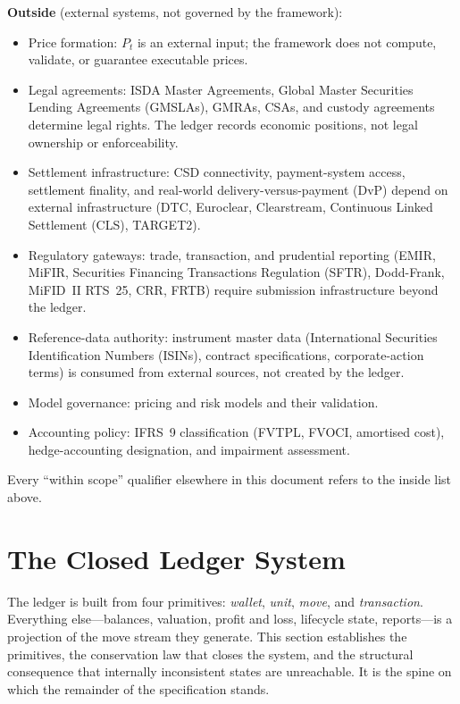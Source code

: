 \documentclass[11pt,a4paper]{article}
\begin{document}
\medskip
\noindent\textbf{Outside} (external systems, not governed by the framework):
\begin{itemize}[nosep]
\item Price formation: $P_t$ is an external input; the framework does not compute, validate, or guarantee executable prices.
\item Legal agreements: ISDA Master Agreements, Global Master Securities Lending Agreements (GMSLAs), GMRAs, CSAs, and custody agreements determine legal rights. The ledger records economic positions, not legal ownership or enforceability.
\item Settlement infrastructure: CSD connectivity, payment-system access, settlement finality, and real-world delivery-versus-payment (DvP) depend on external infrastructure (DTC, Euroclear, Clearstream, Continuous Linked Settlement (CLS), TARGET2).
\item Regulatory gateways: trade, transaction, and prudential reporting (EMIR, MiFIR, Securities Financing Transactions Regulation (SFTR), Dodd-Frank, MiFID~II RTS~25, CRR, FRTB) require submission infrastructure beyond the ledger.
\item Reference-data authority: instrument master data (International Securities Identification Numbers (ISINs), contract specifications, corporate-action terms) is consumed from external sources, not created by the ledger.
\item Model governance: pricing and risk models and their validation.
\item Accounting policy: IFRS~9 classification (FVTPL, FVOCI, amortised cost), hedge-accounting designation, and impairment assessment.
\end{itemize}

\noindent Every ``within scope'' qualifier elsewhere in this document refers to the inside list above.

\section{The Closed Ledger System}
\label{sec:ledger}

The ledger is built from four primitives: \emph{wallet}, \emph{unit}, \emph{move}, and \emph{transaction}. Everything else---balances, valuation, profit and loss, lifecycle state, reports---is a projection of the move stream they generate. This section establishes the primitives, the conservation law that closes the system, and the structural consequence that internally inconsistent states are unreachable. It is the spine on which the remainder of the specification stands.
\end{document}
